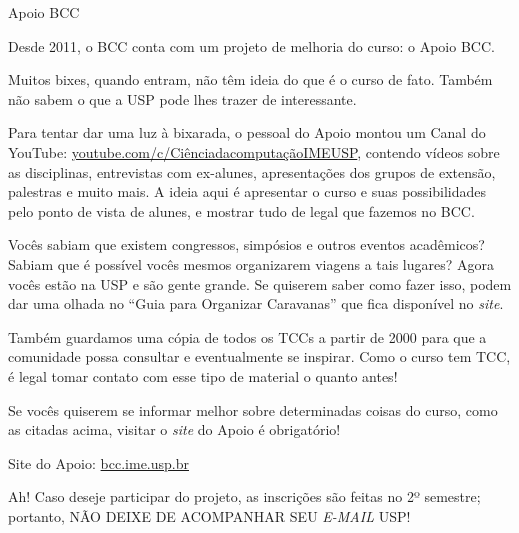 \begin{subsubsecao}{Apoio BCC}

Desde 2011, o BCC conta com um projeto de melhoria do curso: o Apoio BCC.

Muitos bixes, quando entram, não têm ideia do que é o curso de fato. Também não
sabem o que a USP pode lhes trazer de interessante.

Para tentar dar uma luz à bixarada, o pessoal do Apoio montou um Canal do YouTube:
\url{youtube.com/c/CiênciadacomputaçãoIMEUSP}, contendo vídeos sobre as disciplinas,
entrevistas com ex-alunes, apresentações dos grupos de extensão, palestras e muito
mais. A ideia aqui é apresentar o curso e suas possibilidades pelo ponto de vista
de alunes, e mostrar tudo de legal que fazemos no BCC.

Vocês sabiam que existem congressos, simpósios e outros eventos acadêmicos?
Sabiam que é possível vocês mesmos organizarem viagens a tais lugares? Agora
vocês estão na USP e são gente grande. Se quiserem saber como fazer isso, podem 
dar uma olhada no ``Guia para Organizar Caravanas'' que fica disponível 
no \textit{site}.

Também guardamos uma cópia de todos os TCCs a partir de 2000 para que a 
comunidade possa consultar e eventualmente se inspirar. Como o curso tem TCC, é 
legal tomar contato com esse tipo de material o quanto antes!

Se vocês quiserem se informar melhor sobre determinadas coisas do curso, como as
citadas acima, visitar o \textit{site} do Apoio é obrigatório!

Site do Apoio: \url{bcc.ime.usp.br}

Ah! Caso deseje participar do projeto, as inscrições são feitas no 2º 
semestre; portanto, NÃO DEIXE DE ACOMPANHAR SEU \textit{E-MAIL} USP!

\end{subsubsecao}
